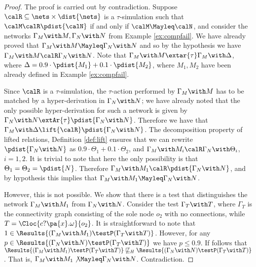 \documentclass{LMCS}
\begin{document}
  \begin{proof}
   The proof is carried out by contradiction. 
   Suppose  $\calR \subseteq \nets \times \dist{\nets}$ 
   is a $\tau$-simulation such that $\calM \calR \pdist{\calN}$ 
   if and only if $\calM \Mayleq \calN$, and consider the 
   networks $\Gamma_M \with M, \Gamma_N \with N$ from Example \ref{ex:compfail}.
    We have already proved that $\Gamma_M \with M \Mayleq \Gamma_N \with N$ 
   and so by the hypothesis we have $\Gamma_M \with M \calR \Gamma_N \with N$. 
   Note that $\Gamma_M \with M \extar{\tau} \Gamma_M \with \Delta$, 
   where $\Delta = 0.9 \cdot \pdist{M_1} + 0.1 \cdot \pdist{M_2}$, 
   where $M_1, M_2$ have been already defined in Example \ref{ex:compfail}. 
         
   Since $\calR$ is a $\tau$-simulation, 
   the $\tau$-action performed by $\Gamma_M \with M$ has to 
   be matched by a hyper-derivation in $\Gamma_N \with N$; 
   we have already noted that the only possible hyper-derivation 
   for such a network is given by $\Gamma_N \with N \extAr{\tau} 
   \pdist{\Gamma_N \with N}$. Therefore we have that 
   $\Gamma_M \with \Delta \lift{\calR} \pdist{\Gamma_N \with N}$. 
   The decomposition property of lifted relations, Definition 
   \ref{def:lift} ensures that we can rewrite 
   $\pdist{\Gamma_N \with N}$ as $0.9 \cdot \Theta_1 + 
   0.1 \cdot \Theta_2$, and  
   $\Gamma_M \with M_i \calR \Gamma_N \with \Theta_i$, 
   $i=1,2$. It is trivial to note that here the only 
   possibility is that $\Theta_1 = \Theta_2 = \pdist{N}$. 
   Therefore $\Gamma_M \with M_1 \calR \pdist{\Gamma_N \with N}$, 
   and by hypothesis this implies that $\Gamma_M \with M_1 
   \Mayleq \Gamma_N \with N$. 
   
   However, this is not possible. We show that there is 
   a test that distinguishes the network $\Gamma_M \with M_1$ 
   from $\Gamma_N \with N$.
   Consider the test $\Gamma_T \with T$, 
   where $\Gamma_T$ is the connectivity graph consisting of 
   the sole node $o_2$ with no connections, while 
   $T = \Cloc{c?\pa{x}.\omega}{o_2}$. 
   It is straightforward to note that 
   $1 \in \Results{(\Gamma_M \with M_1) \testP (\Gamma_T \with T)}$. 
   However, for any $p \in \Results{(\Gamma_N \with N) \testP (\Gamma_T \with T)}$ 
   we have $p \leq 0.9$. If follows that 
   $\Results{(\Gamma_M \with M_1) \testP (\Gamma_T \with T)} \not\sqsubseteq_{H} 
   \Results{(\Gamma_N \with N) \testP (\Gamma_T \with T)}$. That is, 
   $\Gamma_M \with M_1 \not\Mayleq \Gamma_N \with N$. Contradiction. 
  \end{proof}
\end{document}
